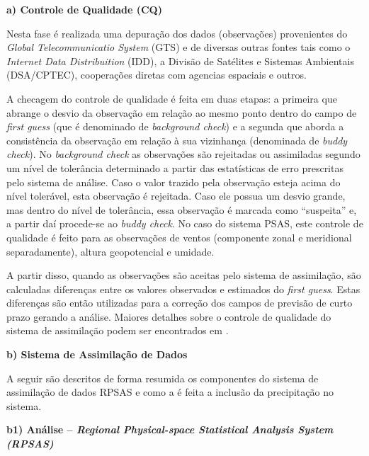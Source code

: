 \textbf{a) Controle de Qualidade (CQ)}

Nesta fase é realizada uma depuração dos dados (observações) provenientes do \textit{Global Telecommunicatio System} (GTS) e de diversas outras fontes tais como o \textit{Internet Data Distribuition} (IDD), a Divisão de Satélites e Sistemas Ambientais (DSA/CPTEC), cooperações diretas com agencias espaciais e outros.

A checagem do controle de qualidade é feita em duas etapas: a primeira que abrange o desvio da observação em relação ao mesmo ponto dentro do campo de \textit{first guess} (que é denominado de \textit{background check}) e a segunda que aborda a consistência da observação em relação à sua vizinhança (denominada de \textit{buddy check}). No \textit{background check} as observações são rejeitadas ou assimiladas segundo um nível de tolerância determinado a partir das estatísticas de erro prescritas pelo sistema de análise. Caso o valor trazido pela observação esteja acima do nível tolerável, esta observação é rejeitada. Caso ele possua um desvio grande, mas dentro do nível de tolerância, essa observação é marcada como ``suspeita'' e, a partir daí procede-se ao \textit{buddy check}. No caso do sistema PSAS, este controle de qualidade é feito para as observações de ventos (componente zonal e meridional separadamente), altura geopotencial e umidade.

A partir disso, quando as observações são aceitas pelo sistema de assimilação, são calculadas diferenças entre os valores observados e estimados do \textit{first guess}. Estas diferenças são então utilizadas para a correção dos campos de previsão de curto prazo gerando a análise.  Maiores detalhes sobre o controle de qualidade do sistema de assimilação podem ser encontrados em .

\textbf{b) Sistema de Assimilação de Dados}

A seguir são descritos de forma resumida os componentes do sistema de assimilação de dados RPSAS e como a é feita a inclusão da precipitação no sistema.

\textbf{b1) Análise – \textit{Regional Physical-space Statistical Analysis System (RPSAS)}}

